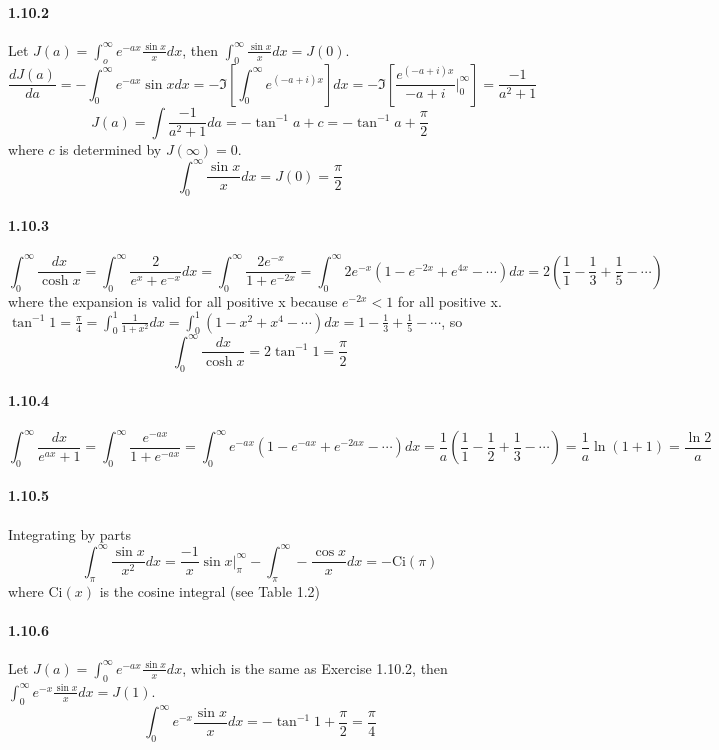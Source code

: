 \documentclass[a4paper]{article}
\begin{document}
\paragraph{1.10.2}
Let $J(a)=\int_o^\infty e^{-ax}\frac{\sin{x}}{x}dx$, then $\int_0^\infty \frac{\sin x}{x}dx=J(0)$.
\[\frac{dJ(a)}{da}=-\int_0^\infty e^{-ax}\sin{x}dx=-\Im{\left[ \int_0^\infty e^{(-a+i)x} \right] dx}=-\Im{\left
[\frac{e^{(-a+i)x}}{-a+i}\bigg|_0^\infty \right]}=\frac{-1}{a^2+1}\]
\[J(a)=\int\frac{-1}{a^2+1}da=-\tan^{-1}a+c=-\tan^{-1}a+\frac{\pi}{2}\]
where $c$ is determined by $J(\infty)=0$.
\[\int_0^\infty \frac{\sin x}{x}dx=J(0)=\frac{\pi}{2}\]

\paragraph{1.10.3}
\[\int_0^\infty\frac{dx}{\cosh{x}}=\int_0^\infty\frac{2}{e^x+e^{-x}}dx=\int_0^\infty\frac{2e^{-x}}{1+e^{-2x}}=\int_0^\infty2e^{-x}(1-e^{-2x}+e^{4x}-\cdots)dx=2(\frac{1}{1}-\frac{1}{3}+\frac{1}{5}-\cdots) \]
where the expansion is valid for all positive x because $e^{-2x}<1$ for all positive x. $\tan^{-1}1=\frac{\pi}{4}=\int_0^1\frac{1}{1+x^2}dx=\int_0^1(1-x^2+x^4-\cdots) dx=1-\frac{1}{3}+\frac{1}{5}-\cdots$, so 
\[\int_0^\infty\frac{dx}{\cosh{x}}=2\tan^{-1}1=\frac{\pi}{2}\]

\paragraph{1.10.4}
\[\int_0^\infty\frac{dx}{e^{ax}+1}=\int_0^\infty\frac{e^{-ax}}{1+e^{-ax}}=\int_0^\infty e^{-ax}(1-e^{-ax}+e^{-2ax}-\cdots)dx=\frac{1}{a}(\frac{1}{1}-\frac{1}{2}+\frac{1}{3}-\cdots)=\frac{1}{a}\ln{(1+1)}=\frac{\ln{2}}{a}\]

\paragraph{1.10.5}
Integrating by parts
\[\int_\pi^\infty\frac{\sin{x}}{x^2}dx=\frac{-1}{x}\sin{x}\Big|_\pi^\infty-\int_\pi^\infty-\frac{\cos{x}}{x}dx=-\mathrm{Ci}(\pi)\]
where $\mathrm{Ci}(x)$ is the cosine integral (see Table 1.2)

\paragraph{1.10.6}
Let $J(a)=\int_0^\infty e^{-ax}\frac{\sin{x}}{x}dx$, which is the same as Exercise 1.10.2, then $\int_0^\infty e^{-x}\frac{\sin{x}}{x}dx=J(1)$.
\[\int_0^\infty e^{-x}\frac{\sin{x}}{x}dx=-\tan^{-1}{1}+\frac{\pi}{2}=\frac{\pi}{4}\]
\end{document}
